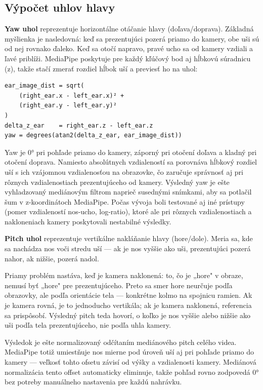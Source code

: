 \subsection{Výpočet uhlov hlavy}

\textbf{Yaw uhol} reprezentuje horizontálne otáčanie hlavy (doľava/doprava). Základná myšlienka je nasledovná: keď sa prezentujúci pozerá priamo do kamery, obe uši sú od nej rovnako ďaleko. Keď sa otočí napravo, pravé ucho sa od kamery vzdiali a ľavé priblíži. MediaPipe poskytuje pre každý kľúčový bod aj hĺbkovú súradnicu (z), takže stačí zmerať rozdiel hĺbok uší a previesť ho na uhol:

\begin{verbatim}
ear_image_dist = sqrt(
    (right_ear.x - left_ear.x)² +
    (right_ear.y - left_ear.y)²
)
delta_z_ear    = right_ear.z - left_ear.z
yaw = degrees(atan2(delta_z_ear, ear_image_dist))
\end{verbatim}

Yaw je 0° pri pohľade priamo do kamery, záporný pri otočení doľava a kladný pri otočení doprava. Namiesto absolútnych vzdialeností sa porovnáva hĺbkový rozdiel uší s ich vzájomnou vzdialenosťou na obrazovke, čo zaručuje správnosť aj pri rôznych vzdialenostiach prezentujúceho od kamery. Výsledný yaw je ešte vyhladzovaný mediánovým filtrom naprieč susednými snímkami, aby sa potlačil šum v z-koordinátoch MediaPipe. Počas vývoja boli testované aj iné prístupy (pomer vzdialeností nos-ucho, log-ratio), ktoré ale pri rôznych vzdialenostiach a nakloneniach kamery poskytovali nestabilné výsledky.

\textbf{Pitch uhol} reprezentuje vertikálne nakláňanie hlavy (hore/dole). Meria sa, kde sa nachádza nos voči stredu uší --- ak je nos vyššie ako uši, prezentujúci pozerá nahor, ak nižšie, pozerá nadol.

Priamy problém nastáva, keď je kamera naklonená: to, čo je „hore" v obraze, nemusí byť „hore" pre prezentujúceho. Preto sa smer hore neurčuje podľa obrazovky, ale podľa orientácie tela --- konkrétne kolmo na spojnicu ramien. Ak je kamera rovná, je to jednoducho vertikála; ak je kamera naklonená, referencia sa prispôsobí. Výsledný pitch teda hovorí, o koľko je nos vyššie alebo nižšie ako uši podľa tela prezentujúceho, nie podľa uhla kamery.

Výsledok je ešte normalizovaný odčítaním mediánového pitch celého videa. MediaPipe totiž umiestňuje nos mierne pod úroveň uší aj pri pohľade priamo do kamery --- veľkosť tohto ofsetu závisí od výšky a vzdialenosti kamery. Mediánová normalizácia tento offset automaticky eliminuje, takže pohľad rovno zodpovedá 0° bez potreby manuálneho nastavenia pre každú nahrávku.

